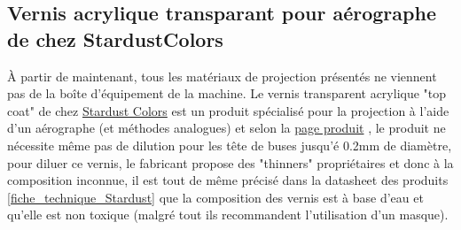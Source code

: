 \newpage
\subsection{Vernis acrylique transparant pour aérographe de chez StardustColors}

À partir de maintenant, tous les matériaux de projection présentés ne viennent pas de la boîte d'équipement de la machine.
Le vernis transparent acrylique "top coat" de chez \href{https://www.stardustcolors.co.uk/}{Stardust Colors} est un produit spécialisé
pour la projection à l'aide d'un aérographe (et méthodes analogues) et selon la \href{https://www.stardustcolors.co.uk/stardust-acrylic-pro-series/1270-airbrush-acrylic-polyurethane-topcoats-matt-satin-or-gloss-3700730801942.html}{page produit}\footnotemark
{}, le produit ne nécessite même pas de dilution pour les tête de buses jusqu'é 0.2mm de diamètre,
pour diluer ce vernis, le fabricant propose des "thinners" propriétaires et donc à la composition inconnue, il est tout de même précisé dans la datasheet des produits \autoref{fiche_technique_Stardust}
que la composition des vernis est à base d'eau et qu'elle est non toxique (malgré tout ils recommandent l'utilisation d'un masque).


